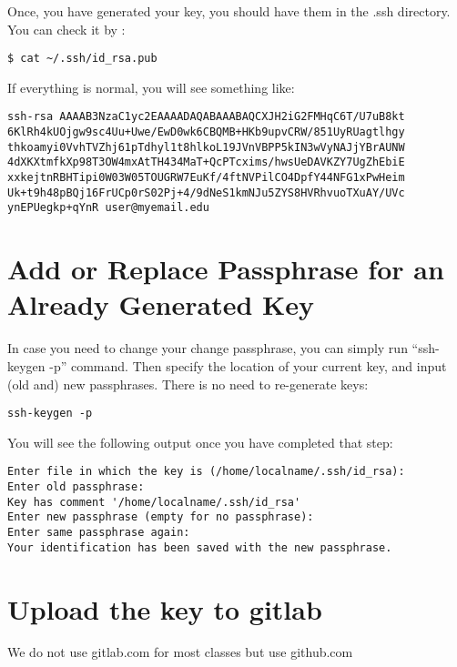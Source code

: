Once, you have generated your key, you should have them in the .ssh
directory. You can check it by :

\begin{verbatim}
$ cat ~/.ssh/id_rsa.pub
\end{verbatim}

If everything is normal, you will see something like:

\begin{verbatim}
ssh-rsa AAAAB3NzaC1yc2EAAAADAQABAAABAQCXJH2iG2FMHqC6T/U7uB8kt
6KlRh4kUOjgw9sc4Uu+Uwe/EwD0wk6CBQMB+HKb9upvCRW/851UyRUagtlhgy
thkoamyi0VvhTVZhj61pTdhyl1t8hlkoL19JVnVBPP5kIN3wVyNAJjYBrAUNW
4dXKXtmfkXp98T3OW4mxAtTH434MaT+QcPTcxims/hwsUeDAVKZY7UgZhEbiE
xxkejtnRBHTipi0W03W05TOUGRW7EuKf/4ftNVPilCO4DpfY44NFG1xPwHeim
Uk+t9h48pBQj16FrUCp0rS02Pj+4/9dNeS1kmNJu5ZYS8HVRhvuoTXuAY/UVc
ynEPUegkp+qYnR user@myemail.edu
\end{verbatim}

\section{Add or Replace Passphrase for an Already Generated
Key}\label{add-or-replace-passphrase-for-an-already-generated-key}

In case you need to change your change passphrase, you can simply run
``ssh-keygen -p'' command. Then specify the location of your current
key, and input (old and) new passphrases. There is no need to
re-generate keys:

\begin{verbatim}
ssh-keygen -p
\end{verbatim}

You will see the following output once you have completed that step:

\begin{verbatim}
Enter file in which the key is (/home/localname/.ssh/id_rsa):
Enter old passphrase:
Key has comment '/home/localname/.ssh/id_rsa'
Enter new passphrase (empty for no passphrase):
Enter same passphrase again:
Your identification has been saved with the new passphrase.  
\end{verbatim}

\section{Upload the key to gitlab}\label{upload-the-key-to-gitlab}

\begin{IU}
We do not use gitlab.com for most classes but use github.com
\end{IU}

